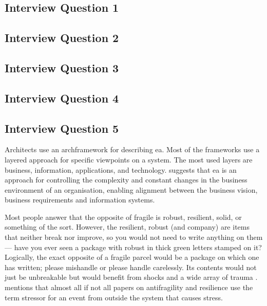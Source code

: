 \subsection{Interview Question 1}

\subsection{Interview Question 2}

\subsection{Interview Question 3}

\subsection{Interview Question 4}

\subsection{Interview Question 5}


Architects use an \gls{archframework} for describing \acrshort{ea}. Most of the frameworks use a layered approach for specific viewpoints on a system. The most used layers are business, information, applications, and technology. \textcite[p. 189]{Ylimaeki2005} suggests that \acrshort{ea} is an approach for controlling the complexity and constant changes in the business environment of an organisation, enabling alignment between the business vision, business requirements and information systems.


Most people answer that the opposite of \gls{fragile} is \gls{robust}, \gls{resilient}, solid, or something of the sort. However, the \gls{resilient}, \gls{robust} (and company) are items that neither break nor improve, so you would not need to write anything on them — have you ever seen a package with \gls{robust} in thick green letters stamped on it? Logically, the exact opposite of a \gls{fragile} parcel would be a package on which one has written; please mishandle or please handle carelessly. Its contents would not just be unbreakable but would benefit from shocks and a wide array of trauma \parencite{Taleb2012}. \textcite[p. 32]{Botjes2020} mentions that almost all if not all papers on antifragility and resilience use the term stressor for an event from outside the system that causes stress.



